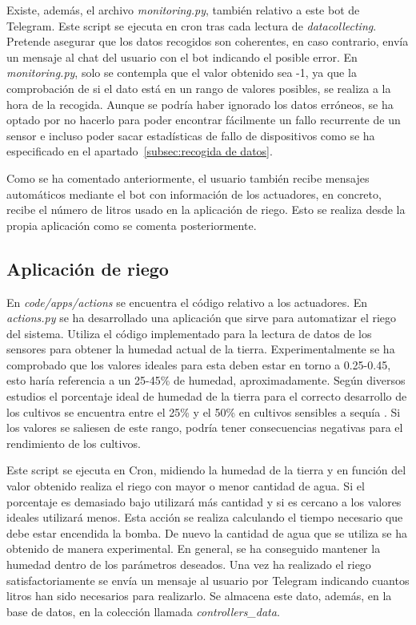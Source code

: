 \documentclass[a4paper, 12pt, oneside]{book}
\begin{document}
Existe, además, el archivo \textit{monitoring.py}, también relativo a este bot de Telegram. Este script se ejecuta en cron tras cada lectura de \textit{datacollecting}. Pretende asegurar que los datos recogidos son coherentes, en caso contrario, envía un mensaje al chat del usuario con el bot indicando el posible error. En \textit{monitoring.py}, solo se contempla que el valor obtenido sea -1, ya que la comprobación de si el dato está en un rango de valores posibles, se realiza a la hora de la recogida. Aunque se podría haber ignorado los datos erróneos, se ha optado por no hacerlo para poder encontrar fácilmente un fallo recurrente de un sensor e incluso poder sacar estadísticas de fallo de dispositivos como se ha especificado en el apartado~\ref{subsec:recogida de datos}.

Como se ha comentado anteriormente, el usuario también recibe mensajes automáticos mediante el bot con información de los actuadores, en concreto, recibe el número de litros usado en la aplicación de riego. Esto se realiza desde la propia aplicación como se comenta posteriormente.

\subsection{Aplicación de riego}
\label{subsec:riego}
En \textit{code/apps/actions} se encuentra el código relativo a los actuadores. En \textit{actions.py} se ha desarrollado una aplicación que sirve para automatizar el riego del sistema. Utiliza el código implementado para la lectura de datos de los sensores para obtener la humedad actual de la tierra. Experimentalmente se ha comprobado que los valores ideales para esta deben estar en torno a 0.25-0.45, esto haría referencia a un 25-45\% de humedad, aproximadamente. Según diversos estudios el porcentaje ideal de humedad de la tierra para el correcto desarrollo de los cultivos se encuentra entre el 25\% y el 50\% en cultivos sensibles a sequía \cite{porcentaje_riego} \cite{humedad_suelo}. Si los valores se saliesen de este rango, podría tener consecuencias negativas para el rendimiento de los cultivos. 

Este script se ejecuta en Cron, midiendo la humedad de la tierra y en función del valor obtenido realiza el riego con mayor o menor cantidad de agua. Si el porcentaje es demasiado bajo utilizará más cantidad y si es cercano a los valores ideales utilizará menos. Esta acción se realiza calculando el tiempo necesario que debe estar encendida la bomba. De nuevo la cantidad de agua que se utiliza se ha obtenido de manera experimental. En general, se ha conseguido mantener la humedad dentro de los parámetros deseados.
Una vez ha realizado el riego satisfactoriamente se envía un mensaje al usuario por Telegram indicando cuantos litros han sido necesarios para realizarlo. Se almacena este dato, además, en la base de datos, en la colección llamada \textit{controllers\_data}.
\end{document}
